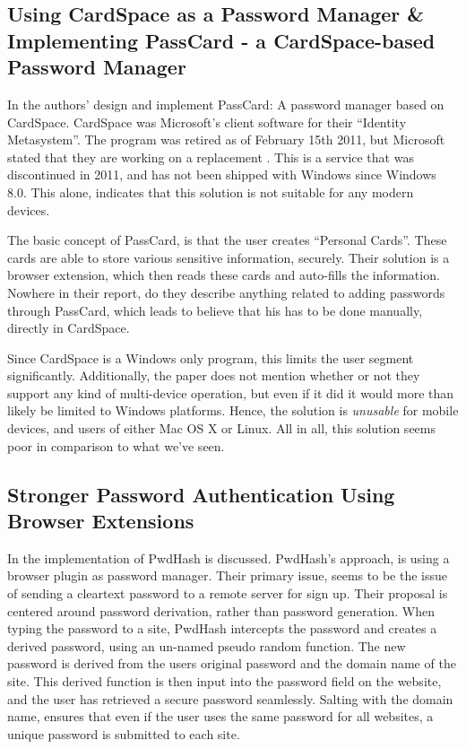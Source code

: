		\subsection*{Using CardSpace as a Password Manager \& Implementing PassCard - a CardSpace-based Password Manager}
			In \cite{cardspace,cardspace_impl} the authors' design and implement PassCard: A password manager based on CardSpace. CardSpace was Microsoft's client software for their ``Identity Metasystem''. The program was retired as of February 15th 2011, but Microsoft stated that they are working on a replacement \cite{cardspace_cancelled}. This is a service that was discontinued in 2011, and has not been shipped with Windows since Windows 8.0. This alone, indicates that this solution is not suitable for any modern devices.

			The basic concept of PassCard, is that the user creates ``Personal Cards''. These cards are able to store various sensitive information, securely. Their solution is a browser extension, which then reads these cards and auto-fills the information. Nowhere in their report, do they describe anything related to adding passwords through PassCard, which leads to believe that his has to be done manually, directly in CardSpace.

			Since CardSpace is a Windows only program, this limits the user segment significantly. Additionally, the paper does not mention whether or not they support any kind of multi-device operation, but even if it did it would more than likely be limited to Windows platforms. Hence, the solution is \emph{unusable} for mobile devices, and users of either Mac OS X or Linux. All in all, this solution seems poor in comparison to what we've seen.

		\subsection*{Stronger Password Authentication Using Browser Extensions}
			In \cite{pwdhash} the implementation of PwdHash is discussed. PwdHash's approach, is using a browser plugin as password manager. Their primary issue, seems to be the issue of sending a cleartext password to a remote server for sign up. Their proposal is centered around password derivation, rather than password generation. When typing the password to a site, PwdHash intercepts the password and creates a derived password, using an un-named pseudo random function. The new password is derived from the users original password and the domain name of the site. This derived function is then input into the password field on the website, and the user has retrieved a secure password seamlessly. Salting with the domain name, ensures that even if the user uses the same password for all websites, a unique password is submitted to each site.

